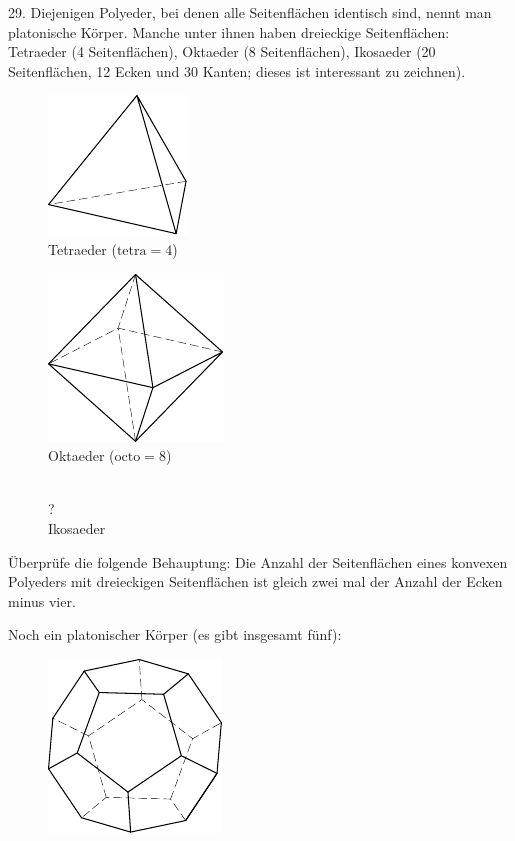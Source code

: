 \begin{problem}{29.}
	Diejenigen Polyeder, bei denen alle Seitenflächen identisch sind, nennt man platonische Körper. Manche unter ihnen haben dreieckige Seitenflächen: Tetraeder (4 Seitenflächen), Oktaeder (8 Seitenflächen), Ikosaeder (20 Seitenflächen, 12 Ecken und 30 Kanten; dieses ist interessant zu zeichnen). 
	\begin{figure}
		\footnotesize
		\null\hfill
		\parbox{0.3\linewidth}{\centering\includegraphics{taskbook-131}\\Tetraeder ($\text{tetra}= 4$)}
		\hfill
		\parbox{0.3\linewidth}{\centering\includegraphics{taskbook-132}\\Oktaeder ($\text{octo}= 8$)}
		\hfill\null\\
		{\Huge ?}\\Ikosaeder
	\end{figure}
	Überprüfe die folgende Behauptung: Die Anzahl der Seitenflächen eines konvexen Polyeders mit dreieckigen Seitenflächen ist gleich zwei mal der Anzahl der Ecken minus vier. 

	Noch ein platonischer Körper (es gibt insgesamt fünf):
	\begin{figure}
		\includegraphics{taskbook-14}
	\end{figure}
\end{problem}

